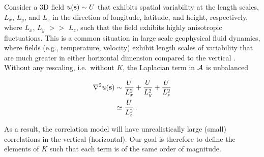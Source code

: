 Consider a 3D field $u(\mathbf{s})\sim U$ that exhibits spatial variability at the
length scales, $L_x$, $L_y$, and $L_z$ in the direction of longitude, latitude,
and height, respectively,
where $L_x$, $L_y$ $>>$ $L_z$, such that the field exhibits highly
anisotropic fluctuations.
This is a common situation in large scale geophysical fluid
dynamics, where fields (e.g., temperature, velocity) exhibit length scales of
variability that are much greater in either horizontal dimension compared to the
vertical \citep[e.g.,][]{vallis2006}.
Without any rescaling, i.e.\ without $K$,
the Laplacian term in $\mathcal{A}$ is unbalanced
\begin{linenomath*}\begin{equation}
    \begin{aligned}
        \nabla^2 u(\mathbf{s})
            & \sim \dfrac{U}{L_x^2} + \dfrac{U}{L_y^2} + \dfrac{U}{L_z^2} \\
            & \simeq \dfrac{U}{L_z^2} \, .
    \end{aligned}
    \label{eq:iso_lap}
\end{equation}\end{linenomath*}
As a result, the correlation model will
have unrealistically large (small) correlations in the vertical (horizontal).
Our goal is therefore to define the elements of $K$ such that each term is of
the same order of magnitude.

